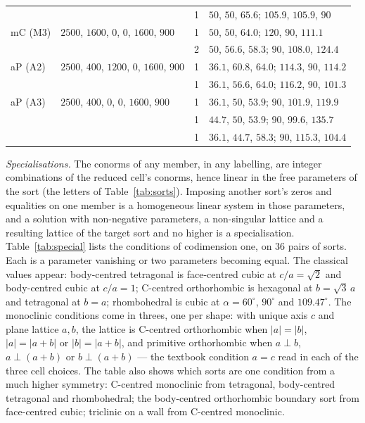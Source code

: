 \documentclass[preprint,pdf]{iucr}          %
\begin{document}
\begin{table}
\begin{footnotesize}
\begin{tabular}{llrl}
   &            & 1 & $50$, $50$, $65.6$; $105.9$, $105.9$, $90$ \\
mC (M3) & $2500$, $1600$, $0$, $0$, $1600$, $900$ & 1 & $50$, $50$, $64.0$; $120$, $90$, $111.1$ \\
   &            & 2 & $50$, $56.6$, $58.3$; $90$, $108.0$, $124.4$ \\
aP (A2) & $2500$, $400$, $1200$, $0$, $1600$, $900$ & 1 & $36.1$, $60.8$, $64.0$; $114.3$, $90$, $114.2$ \\
   &            & 1 & $36.1$, $56.6$, $64.0$; $116.2$, $90$, $101.3$ \\
aP (A3) & $2500$, $400$, $0$, $0$, $1600$, $900$ & 1 & $36.1$, $50$, $53.9$; $90$, $101.9$, $119.9$ \\
   &            & 1 & $44.7$, $50$, $53.9$; $90$, $99.6$, $135.7$ \\
   &            & 1 & $36.1$, $44.7$, $58.3$; $90$, $115.3$, $104.4$ \\
\bottomrule
\end{tabular}
\end{footnotesize}
\end{table}

\emph{Specialisations.} The conorms of any member, in any labelling, are integer combinations of the reduced cell's conorms, hence linear in the free parameters of the sort (the letters of Table~\ref{tab:sorts}). Imposing another sort's zeros and equalities on one member is a homogeneous linear system in those parameters, and a solution with non-negative parameters, a non-singular lattice and a resulting lattice of the target sort and no higher is a specialisation. Table~\ref{tab:special} lists the conditions of codimension one, on 36 pairs of sorts. Each is a parameter vanishing or two parameters becoming equal. The classical values appear: body-centred tetragonal is face-centred cubic at $c/a=\sqrt2$ and body-centred cubic at $c/a=1$; C-centred orthorhombic is hexagonal at $b=\sqrt3\,a$ and tetragonal at $b=a$; rhombohedral is cubic at $\alpha=60^\circ$, $90^\circ$ and $109.47^\circ$. The monoclinic conditions come in threes, one per shape: with unique axis $c$ and plane lattice $a,b$, the lattice is C-centred orthorhombic when $|a|=|b|$, $|a|=|a+b|$ or $|b|=|a+b|$, and primitive orthorhombic when $a\perp b$, $a\perp(a+b)$ or $b\perp(a+b)$ --- the textbook condition $a=c$ read in each of the three cell choices. The table also shows which sorts are one condition from a much higher symmetry: C-centred monoclinic from tetragonal, body-centred tetragonal and rhombohedral; the body-centred orthorhombic boundary sort from face-centred cubic; triclinic on a wall from C-centred monoclinic.
\end{document}
